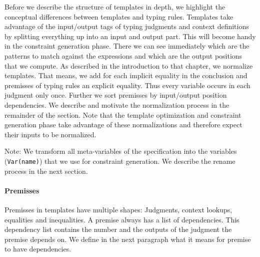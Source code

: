 Before we describe the structure of templates in depth, we highlight
the conceptual differences between templates and typing rules.
Templates take advantage of the input/output tags of typing judgments
and context definitions by splitting everything up into an input and
output part. This will become handy in the constraint generation
phase. There we can see immediately which are the patterns to match
against the expressions and which are the output positions that we
compute. As described in the introduction to that chapter, we
normalize templates. That means, we add for each implicit equality in
the conclusion and premisses of typing rules an explicit
equality. Thus every variable occurs in each judgment only
once. Further we sort premisses by input/output position
dependencies. We describe and motivate the normalization process in
the remainder of the section. Note that the template optimization and
constraint generation phase take advantage of these normalizations and
therefore expect their inputs to be normalized.

Note: We transform all meta-variables of the specification into the
variables (\verb|Var(name)|) that we use for constraint
generation. We describe the rename process in the next section.

\paragraph*{Premisses}
Premisses in templates have multiple shapes: Judgments, context
lookups, equalities and inequalities. A premise always has a list of
dependencies. This dependency list contains the number and the outputs
of the judgment the premise depends on. We define in the next
paragraph what it means for premise to have dependencies.

